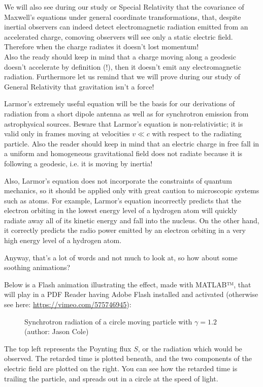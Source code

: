 	\begin{tcolorbox}[title=Remark,colframe=black,arc=10pt]
	We will also see during our study or Special Relativity that the covariance of Maxwell's equations under general coordinate transformations, that, despite inertial observers can indeed detect electromagnetic radiation emitted from an accelerated charge, comoving observers will see only a static electric field. Therefore when the charge radiates it doesn't lost momentum!\\
	
	Also the ready should keep in mind that a charge moving along a geodesic doesn't accelerate by definition (!), then it doesn't emit any electromagnetic radiation. Furthermore let us remind that we will prove during our study of General Relativity that gravitation isn't a force!
	\end{tcolorbox}

	Larmor's extremely useful equation will be the basis for our derivations of radiation from a short dipole antenna as well as for synchrotron emission from astrophysical sources. Beware that Larmor's equation is non-relativistic; it is valid only in frames moving at velocities $v\ll c$ with respect to the radiating particle. Also the reader should keep in mind that an electric charge in free fall in a uniform and homogeneous gravitational field does not radiate because it is following a geodesic, i.e. it is moving by inertia!
	
	Also, Larmor's equation does not incorporate the constraints of quantum mechanics, so it should be applied only with great caution to microscopic systems such as atoms. For example, Larmor's equation incorrectly predicts that the electron orbiting in the lowest energy level of a hydrogen atom will quickly radiate away all of its kinetic energy and fall into the nucleus. On the other hand, it correctly predicts the radio power emitted by an electron orbiting in a very high energy level of a hydrogen atom.
	
	Anyway, that's a lot of words and not much to look at, so how about some soothing animations? 
	
	Below is a Flash animation illustrating the effect, made with MATLAB™, that will play in a PDF Reader having Adobe Flash installed and activated (otherwise see here: \url{https://vimeo.com/575746945}):
	\begin{figure}[H]
		\caption[Synchrotron radiations of a moving charge]{Synchrotron radiation of a circle moving particle with $\gamma=1.2$ (author: Jason Cole)}
	\end{figure}
	The top left represents the Poynting flux $S$, or the radiation which would be observed. The retarded time is plotted beneath, and the two components of the electric field are plotted on the right. You can see how the retarded time is trailing the particle, and spreads out in a circle at the speed of light.


